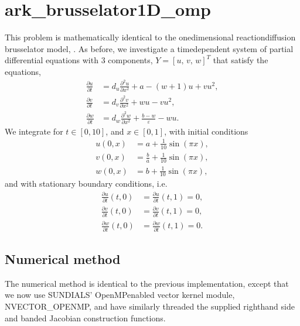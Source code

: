 \documentclass[letterpaper,10pt,english]{sphinxmanual}
\begin{document}
\section{ark\_brusselator1D\_omp}
\label{\detokenize{c_openmp:ark-brusselator1d-omp}}\label{\detokenize{c_openmp:id1}}
\sphinxAtStartPar
This problem is mathematically identical to the one\sphinxhyphen{}dimensional
reaction\sphinxhyphen{}diffusion brusselator model, {\hyperref[\detokenize{c_serial:ark-brusselator1d}]{}}.  As
before, we investigate a time\sphinxhyphen{}dependent system of partial differential
equations with 3 components, \(Y = [u,\, v,\, w]^T\) that satisfy
the equations,
\begin{equation*}
\begin{split}\frac{\partial u}{\partial t} &= d_u \frac{\partial^2 u}{\partial
   x^2} + a - (w+1) u + v u^2, \\
\frac{\partial v}{\partial t} &= d_v \frac{\partial^2 v}{\partial
   x^2} + w u - v u^2, \\
\frac{\partial w}{\partial t} &= d_w \frac{\partial^2 w}{\partial
   x^2} + \frac{b-w}{\varepsilon} - w u.\end{split}
\end{equation*}
\sphinxAtStartPar
We integrate for \(t \in [0, 10]\), and \(x \in [0, 1]\), with
initial conditions
\begin{equation*}
\begin{split}u(0,x) &=  a + \frac{1}{10} \sin(\pi x),\\
v(0,x) &= \frac{b}{a} + \frac{1}{10}\sin(\pi x),\\
w(0,x) &=  b + \frac{1}{10}\sin(\pi x),\end{split}
\end{equation*}
\sphinxAtStartPar
and with stationary boundary conditions, i.e.
\begin{equation*}
\begin{split}\frac{\partial u}{\partial t}(t,0) &= \frac{\partial u}{\partial t}(t,1) = 0,\\
\frac{\partial v}{\partial t}(t,0) &= \frac{\partial v}{\partial t}(t,1) = 0,\\
\frac{\partial w}{\partial t}(t,0) &= \frac{\partial w}{\partial t}(t,1) = 0.\end{split}
\end{equation*}

\subsection{Numerical method}
\label{\detokenize{c_openmp:numerical-method}}
\sphinxAtStartPar
The numerical method is identical to the previous implementation,
except that we now use SUNDIALS’ OpenMP\sphinxhyphen{}enabled vector kernel module,
NVECTOR\_OPENMP, and have similarly threaded the supplied right\sphinxhyphen{}hand
side and banded Jacobian construction functions.
\end{document}
